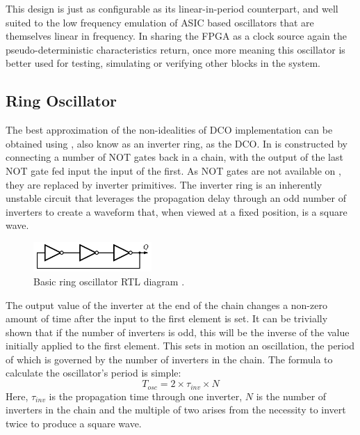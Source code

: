 This design is just as configurable as its linear-in-period counterpart, and well suited to the low frequency emulation of \ac{ASIC} based oscillators that are themselves linear in frequency. In sharing the \ac{FPGA} as a clock source again the pseudo-deterministic characteristics return, once more meaning this oscillator is better used for testing, simulating or verifying other blocks in the system.

\subsection{Ring Oscillator}
The best approximation of the non-idealities of  \ac{DCO} implementation can be obtained using , also know as an inverter ring, as the \ac{DCO}. In   is constructed by connecting a number of NOT gates back in a chain, with the output of the last NOT gate fed input the input of the first. As NOT gates are not available on , they are replaced by inverter primitives. The inverter ring is an inherently unstable circuit that leverages the propagation delay through an odd number of inverters to create a waveform that, when viewed at a fixed position, is a square wave. 
\begin{figure}[h]
	\centering
	\includegraphics[width=0.4\textwidth]{../RO-wiki}
	\caption[Basic ring oscillator \ac{RTL} diagram]{Basic ring oscillator \ac{RTL} diagram \cite{ro_wiki}.}
	\label{fig:ro_wiki}
\end{figure}

The output value of the inverter at the end of the chain changes a non-zero amount of time after the input to the first element is set. It can be trivially shown that if the number of inverters is odd, this will be the inverse of the value initially applied to the first element. This sets in motion an oscillation, the period of which is governed by the number of inverters in the chain. The formula to calculate the oscillator's period is simple:
\begin{equation}
	T_{osc} = 2\times \tau_{inv} \times N
\end{equation}
Here, $\tau_{inv}$ is the propagation time through one inverter, $N$ is the number of inverters in the chain and the multiple of two arises from the necessity to invert twice to produce a square wave.

